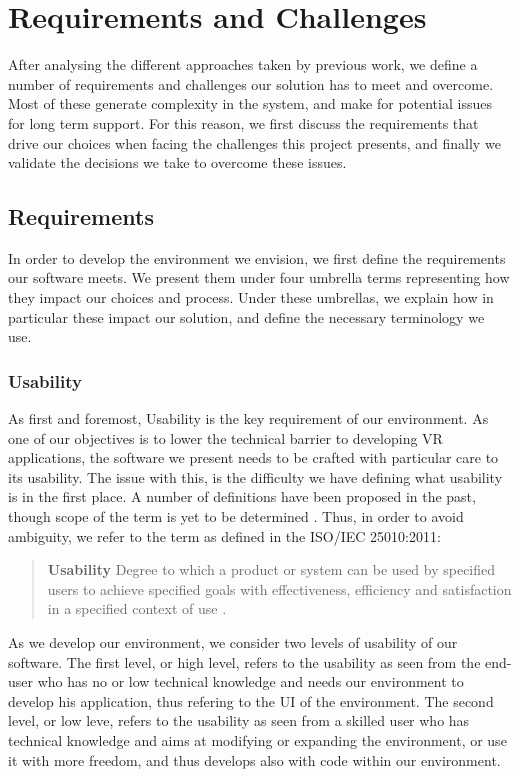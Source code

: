 \chapter{Requirements and Challenges}
\label{ch:rqrmsandclngs}

After analysing the different approaches taken by previous work, we define a number of requirements and challenges our solution has to meet and overcome. Most of these generate complexity in the system, and make for potential issues for long term support. For this reason, we first discuss the requirements that drive our choices when facing the challenges this project presents, and finally we validate the decisions we take to overcome these issues.

\section{Requirements}
\label{sec:rqrmsandclngs-requirements}

In order to develop the environment we envision, we first define the requirements our software meets. We present them under four umbrella terms representing how they impact our choices and process. Under these umbrellas, we explain how in particular these impact our solution, and define the necessary terminology we use.

\subsection{Usability}

As first and foremost, Usability is the key requirement of our environment. As one of our objectives is to lower the technical barrier to developing VR applications, the software we present needs to be crafted with particular care to its usability. The issue with this, is the difficulty we have defining what usability is in the first place. A number of definitions have been proposed in the past, though scope of the term is yet to be determined \cite{8279761}. Thus, in order to avoid ambiguity, we refer to the term as defined in the ISO/IEC 25010:2011:

\begin{quote}
    \textbf{Usability} Degree to which a product or system can be used by specified users to achieve specified goals with effectiveness, efficiency and satisfaction in a specified context of use \cite{25010:2011}.
\end{quote}

As we develop our environment, we consider two levels of usability of our software. The first level, or high level, refers to the usability as seen from the end-user who has no or low technical knowledge and needs our environment to develop his application, thus refering to the UI of the environment. The second level, or low leve, refers to the usability as seen from a skilled user who has technical knowledge and aims at modifying or expanding the environment, or use it with more freedom, and thus develops also with code within our environment.

